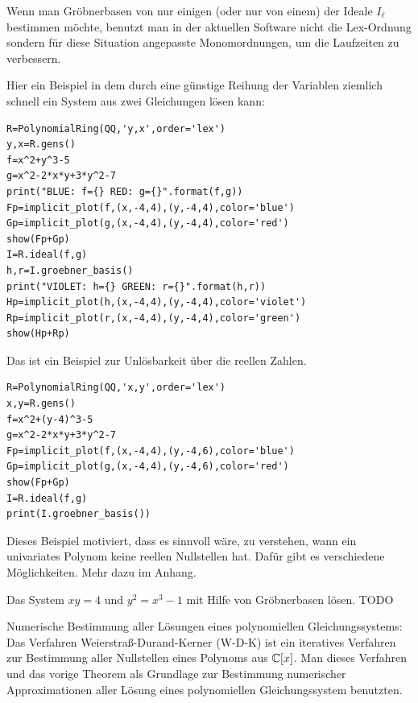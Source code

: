 \documentclass[11pt]{article}
\numberwithin{equation}{section}
\begin{document}
\begin{remark} 
	Wenn man Gröbnerbasen von nur einigen (oder nur von einem) der Ideale $I_\ell$ bestimmen möchte, benutzt man in der aktuellen Software nicht die Lex-Ordnung sondern für diese Situation angepasste Monomordnungen, um die Laufzeiten zu verbessern. 
\end{remark} 

\begin{beispiel}
	Hier ein Beispiel in dem durch eine günstige Reihung der Variablen ziemlich schnell ein  System aus zwei Gleichungen lösen kann: 
\begin{lstlisting} 
R=PolynomialRing(QQ,'y,x',order='lex')
y,x=R.gens()
f=x^2+y^3-5
g=x^2-2*x*y+3*y^2-7
print("BLUE: f={} RED: g={}".format(f,g))
Fp=implicit_plot(f,(x,-4,4),(y,-4,4),color='blue')
Gp=implicit_plot(g,(x,-4,4),(y,-4,4),color='red')
show(Fp+Gp)
I=R.ideal(f,g)
h,r=I.groebner_basis()
print("VIOLET: h={} GREEN: r={}".format(h,r))
Hp=implicit_plot(h,(x,-4,4),(y,-4,4),color='violet')
Rp=implicit_plot(r,(x,-4,4),(y,-4,4),color='green')
show(Hp+Rp)
\end{lstlisting}
\end{beispiel} 

\begin{beispiel} Das ist ein Beispiel zur Unlösbarkeit über die reellen Zahlen. 
\begin{lstlisting} 
R=PolynomialRing(QQ,'x,y',order='lex')
x,y=R.gens()
f=x^2+(y-4)^3-5
g=x^2-2*x*y+3*y^2-7
Fp=implicit_plot(f,(x,-4,4),(y,-4,6),color='blue')
Gp=implicit_plot(g,(x,-4,4),(y,-4,6),color='red')
show(Fp+Gp)
I=R.ideal(f,g)
print(I.groebner_basis())
\end{lstlisting} 
Dieses Beispiel motiviert, dass es sinnvoll wäre, zu verstehen, wann ein univariates Polynom keine reellen Nullstellen hat. Dafür gibt es verschiedene Möglichkeiten. Mehr dazu im Anhang. 
\end{beispiel} 

\begin{beispiel}
	Das System $xy=4$ und $y^2 = x^3 - 1$ mit Hilfe von Gröbnerbasen lösen. TODO 
\end{beispiel} 

\begin{remark} 
	Numerische Bestimmung aller Lösungen eines polynomiellen Gleichungssystems: Das Verfahren Weierstraß-Durand-Kerner (W-D-K) ist ein iteratives Verfahren zur Bestimmung aller Nullstellen eines Polynoms aus $\mathbb{C}[x]$. Man dieses Verfahren und das vorige Theorem als Grundlage zur Bestimmung numerischer Approximationen aller Lösung eines polynomiellen Gleichungssystem benutzten. 
\end{remark} 
\end{document}

